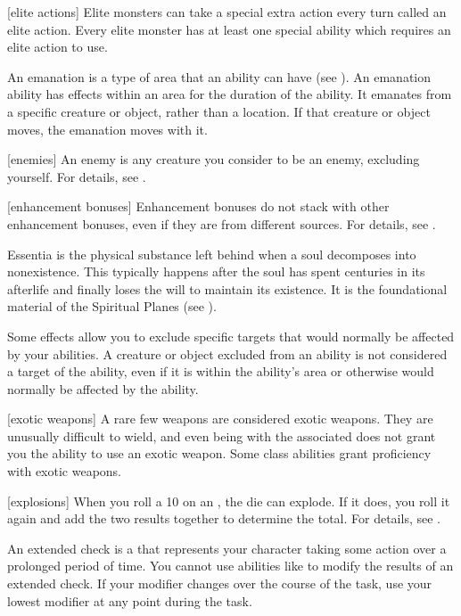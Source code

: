 [elite actions] Elite monsters can take a special extra action every turn called an elite action.
Every elite monster has at least one special ability which requires an elite action to use.

 An emanation is a type of area that an ability can have (see ).
An emanation ability has effects within an area for the duration of the ability.
It emanates from a specific creature or object, rather than a location.
If that creature or object moves, the emanation moves with it.

[enemies] An enemy is any creature you consider to be an enemy, excluding yourself.
For details, see .

[enhancement bonuses] Enhancement bonuses do not stack with other enhancement bonuses, even if they are from different sources.
For details, see .

 Essentia is the physical substance left behind when a soul decomposes into nonexistence.
This typically happens after the soul has spent centuries in its afterlife and finally loses the will to maintain its existence.
It is the foundational material of the Spiritual Planes (see ).

 Some effects allow you to exclude specific targets that would normally be affected by your abilities.
A creature or object excluded from an ability is not considered a target of the ability, even if it is within the ability's area or otherwise would normally be affected by the ability.

[exotic weapons] A rare few weapons are considered exotic weapons.
They are unusually difficult to wield, and even being  with the associated  does not grant you the ability to use an exotic weapon.
Some class abilities grant proficiency with exotic weapons.

[explosions] When you roll a 10 on an , the die can explode.
If it does, you roll it again and add the two results together to determine the total.
For details, see .

 An extended check is a  that represents your character taking some action over a prolonged period of time.
You cannot use abilities like  to modify the results of an extended check.
If your modifier changes over the course of the task, use your lowest modifier at any point during the task.

